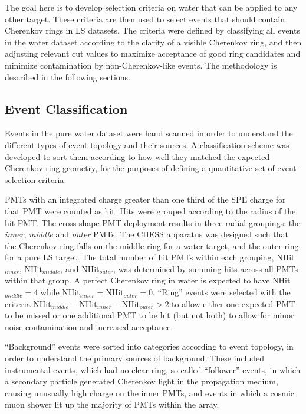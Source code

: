 The goal here is to develop selection criteria on water that can be applied to any other target.
These criteria are then used to select events that should contain Cherenkov rings in LS datasets.
The criteria were defined by classifying all events in the water dataset according to the clarity of a visible Cherenkov ring, and then adjusting relevant cut values to maximize acceptance of good ring candidates and minimize contamination by non-Cherenkov-like events.
The methodology is described in the following sections.

\subsection{Event Classification}\label{s:class}
Events in the pure water dataset were hand scanned in order to understand the different types of event topology and their sources.
A classification scheme was developed to sort them according to how well they matched the expected Cherenkov ring geometry, for the purposes of defining a quantitative set of event-selection criteria. 

PMTs with an integrated charge greater than one third of the SPE charge for that PMT were counted as hit.  
Hits were grouped according to the radius of the hit PMT.  
The cross-shape PMT deployment results in three radial groupings: the \textit{ inner}, \textit{ middle} and \textit{ outer} PMTs.  
The CHESS apparatus was designed such that the Cherenkov ring falls on the middle ring for a water target, and the outer ring for a pure LS target.  
The total number of hit PMTs within each grouping, 
NHit$_{inner}$, NHit$_{middle}$, and NHit$_{outer}$, was determined by summing hits across all PMTs within that group. 
A perfect Cherenkov ring in water is expected to have NHit$_{middle} = 4$ while NHit$_{inner} = \mathrm{ NHit}_{outer} = 0$. 
``Ring'' events were selected with the criteria NHit$_{middle} - \mathrm{ NHit}_{inner} - \mathrm{ NHit}_{outer} > 2$ to allow either one expected PMT to be missed or one additional PMT to be hit (but not both) to allow for minor noise contamination and increased acceptance.

``Background'' events were sorted into categories according to  event topology, in order to understand the primary sources of background.  
These included instrumental events, which had no clear ring, so-called ``follower'' events, in which a secondary particle generated Cherenkov light in the propagation medium, causing unusually high charge on the inner PMTs, and events in which a cosmic muon shower lit up the majority of PMTs within the array.

